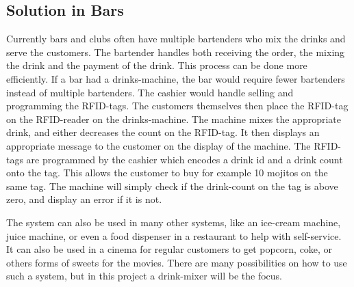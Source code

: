 \subsection{Solution in Bars}
\label{SolutionInBars}
Currently bars and clubs often have multiple bartenders who mix the drinks and serve the customers. The bartender handles both receiving the order, the mixing the drink and the payment of the drink. This process can be done more efficiently. If a bar had a drinks-machine, the bar would require fewer bartenders instead of multiple bartenders. The cashier would handle selling and programming the RFID-tags. The customers themselves then place the RFID-tag on the RFID-reader on the drinks-machine. The machine mixes the appropriate drink, and either decreases the count on the RFID-tag. It then displays an appropriate message to the customer on the display of the machine. The RFID-tags are programmed by the cashier which encodes a drink id and a drink count onto the tag. This allows the customer to buy for example 10 mojitos on the same tag. The machine will simply check if the drink-count on the tag is above zero, and display an error if it is not.

The system can also be used in many other systems, like an ice-cream machine, juice machine, or even a food dispenser in a restaurant to help with self-service. It can also be used in a cinema for regular customers to get popcorn, coke, or others forms of sweets for the movies. There are many possibilities on how to use such a system, but in this project a drink-mixer will be the focus.